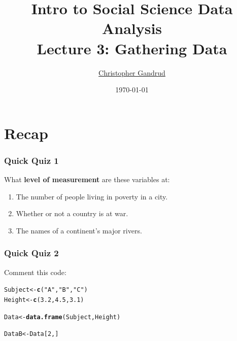 \documentclass{beamer}\usepackage{graphicx, color}
\title[]{Intro to Social Science Data Analysis \\[1cm] Lecture 3:  Gathering Data}
\author[]{
    \href{mailto:gandrud@yonsei.ac.kr}{Christopher Gandrud}
}
\date{\today}
\makeatletter
\newcommand{\hlfunctioncall}[1]{\textcolor[rgb]{0.501960784313725,0,0.329411764705882}{\textbf{#1}}}%
\newcommand{\hlstring}[1]{\textcolor[rgb]{0.6,0.6,1}{#1}}%
\newenvironment{kframe}{%
 \def\at@end@of@kframe{}%
 \ifinner\ifhmode%
  \def\at@end@of@kframe{\end{minipage}}%
  \begin{minipage}{\columnwidth}%
 \fi\fi%
 \def\FrameCommand##1{\hskip\@totalleftmargin \hskip-\fboxsep
 \colorbox{shadecolor}{##1}\hskip-\fboxsep
     \hskip-\linewidth \hskip-\@totalleftmargin \hskip\columnwidth}%
 \MakeFramed {\advance\hsize-\width
   \@totalleftmargin\z@ \linewidth\hsize
   \@setminipage}}%
 {\par\unskip\endMakeFramed%
 \at@end@of@kframe}
\newenvironment{knitrout}{}{} %
\makeatother
\begin{document}
\frame{\titlepage}

\section[Outline]{}
\frame{\tableofcontents}

\section{Recap}

\begin{frame}[fragile]
  \frametitle{Quick Quiz 1}
  What {\bf{level of measurement}} are these variables at:
  \begin{enumerate}
    \item The number of people living in poverty in a city.
    \item Whether or not a country is at war.
    \item The names of a continent's major rivers.
  \end{enumerate}
\end{frame}

\begin{frame}[fragile]
  \frametitle{Quick Quiz 2}
  Comment this code:
\begin{knitrout}
\color{fgcolor}\begin{kframe}
\begin{alltt}
Subject <- \hlfunctioncall{c}(\hlstring{"A"}, \hlstring{"B"}, \hlstring{"C"})
Height <- \hlfunctioncall{c}(3.2, 4.5, 3.1)

Data <- \hlfunctioncall{data.frame}(Subject, Height)

DataB <- Data[2, ]
\end{alltt}
\end{kframe}
\end{knitrout}

\end{frame}
\end{document}
